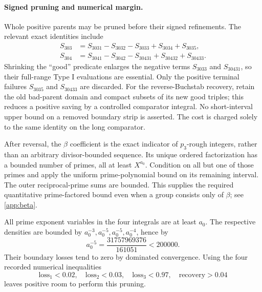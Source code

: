 \paragraph{Signed pruning and numerical margin.}
Whole positive parents may be pruned before their signed refinements.
The relevant exact identities include
\begin{align*}
 S_{303}&=S_{3031}-S_{3032}-S_{3033}+S_{3034}+S_{3035},\\
 S_{304}&=S_{3041}-S_{3042}-S_{30431}+S_{30432}+S_{30433}.
\end{align*}
Shrinking the ``good'' predicate enlarges the negative terms
$S_{3033}$ and $S_{30431}$, so their full-range Type I evaluations
are essential. Only the positive terminal failures $S_{3035}$ and
$S_{30433}$ are discarded. For the reverse-Buchstab recovery, retain
the old bad-parent domain and compact subsets of its new good triples;
this reduces a positive saving by a controlled comparator integral.
No short-interval upper bound on a removed boundary strip is asserted.
The cost is charged solely to the same identity on the long comparator.

After reversal, the $\beta$ coefficient is the exact indicator of
$p_3$-rough integers, rather than an arbitrary divisor-bounded sequence.
Its unique ordered factorization has a bounded number of primes,
all at least $X^{a_0}$. Condition on all but one of those primes and
apply the uniform prime-polynomial bound on its remaining interval.
The outer reciprocal-prime sums are bounded. This supplies the
required quantitative prime-factored bound even when a group consists
only of $\beta$; see \cref{app:beta}.

All prime exponent variables in the four integrals are at least
$a_0$. The respective densities are bounded by
$a_0^{-3},a_0^{-5},a_0^{-5},a_0^{-4}$, hence by
\[
 a_0^{-5}=\frac{31757969376}{161051}<200000.
\]
Their boundary losses tend to zero by dominated convergence.
Using the four recorded numerical inequalities
\[
  \text{loss}_1<0.02,\quad \text{loss}_2<0.03,\quad
  \text{loss}_3<0.97,\quad \text{recovery}>0.04
\]
leaves positive room to perform this pruning.

